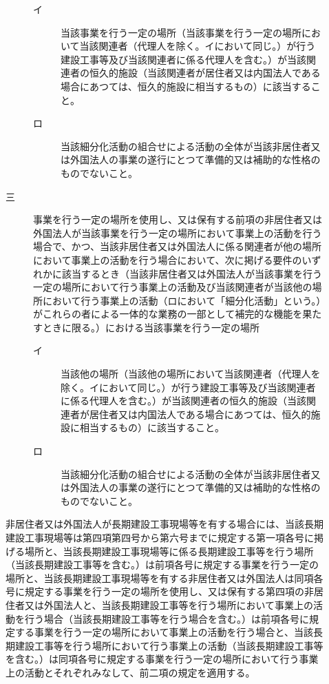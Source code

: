 \documentclass[twocolumn,a4j,10pt]{ltjtarticle}
\begin{document}
\begin{description}
\begin{description}
\begin{description}
\item[イ]当該事業を行う一定の場所（当該事業を行う一定の場所において当該関連者（代理人を除く。イにおいて同じ。）が行う建設工事等及び当該関連者に係る代理人を含む。）が当該関連者の恒久的施設（当該関連者が居住者又は内国法人である場合にあつては、恒久的施設に相当するもの）に該当すること。
\item[ロ]当該細分化活動の組合せによる活動の全体が当該非居住者又は外国法人の事業の遂行にとつて準備的又は補助的な性格のものでないこと。
\end{description}
\item[三]事業を行う一定の場所を使用し、又は保有する前項の非居住者又は外国法人が当該事業を行う一定の場所において事業上の活動を行う場合で、かつ、当該非居住者又は外国法人に係る関連者が他の場所において事業上の活動を行う場合において、次に掲げる要件のいずれかに該当するとき（当該非居住者又は外国法人が当該事業を行う一定の場所において行う事業上の活動及び当該関連者が当該他の場所において行う事業上の活動（ロにおいて「細分化活動」という。）がこれらの者による一体的な業務の一部として補完的な機能を果たすときに限る。）における当該事業を行う一定の場所
\begin{description}
\item[イ]当該他の場所（当該他の場所において当該関連者（代理人を除く。イにおいて同じ。）が行う建設工事等及び当該関連者に係る代理人を含む。）が当該関連者の恒久的施設（当該関連者が居住者又は内国法人である場合にあつては、恒久的施設に相当するもの）に該当すること。
\item[ロ]当該細分化活動の組合せによる活動の全体が当該非居住者又は外国法人の事業の遂行にとつて準備的又は補助的な性格のものでないこと。
\end{description}
\end{description}
\item[\rensuji{6}]非居住者又は外国法人が長期建設工事現場等を有する場合には、当該長期建設工事現場等は第四項第四号から第六号までに規定する第一項各号に掲げる場所と、当該長期建設工事現場等に係る長期建設工事等を行う場所（当該長期建設工事等を含む。）は前項各号に規定する事業を行う一定の場所と、当該長期建設工事現場等を有する非居住者又は外国法人は同項各号に規定する事業を行う一定の場所を使用し、又は保有する第四項の非居住者又は外国法人と、当該長期建設工事等を行う場所において事業上の活動を行う場合（当該長期建設工事等を行う場合を含む。）は前項各号に規定する事業を行う一定の場所において事業上の活動を行う場合と、当該長期建設工事等を行う場所において行う事業上の活動（当該長期建設工事等を含む。）は同項各号に規定する事業を行う一定の場所において行う事業上の活動とそれぞれみなして、前二項の規定を適用する。

\end{description}
\end{document}
